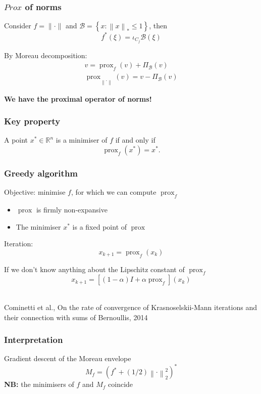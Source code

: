 \documentclass[aspectratio=169]{beamer}
\DeclareMathOperator{\Prox}{prox}
\newcommand{\prox}[2]{\Prox_{#1}\left({#2}\right)}
\newcommand{\RR}{\mathbb{R}}
\newcommand{\norm}[1]{\left\|#1\right\|}
\newcommand{\normtwosq}[1]{\left\|#1\right\|_2^2}
\begin{document}
		\begin{frame}
		\frametitle{$Prox$ of norms}
		Consider $f = \|\cdot\|$ and $\mathcal{B} = \left\{x : \norm{x}_*\le 1 \right\}$, then
		\begin{equation}
		\nonumber f^* \left(\xi\right) = \iota_{C_j}\mathcal{B}\left(\xi\right)
		\end{equation}
		
		By Moreau decomposition:
		\begin{gather}
		\nonumber v = \prox{f}{v} + \Pi_{\mathcal{B}}(v)\\
		\nonumber \prox{\norm{\cdot}}{v} = v - \Pi_{\mathcal{B}}(v)
		\end{gather}
		\pause
		\begin{center}
		\textbf{We have the proximal operator of norms!}
		\end{center}
		\end{frame}
		
		\begin{frame}
		\frametitle{Key property}
		A point $x^*\in \RR^n$ is a minimiser of $f$ if and only if 
		\begin{equation}
		\label{eq:fixedpointprox}
		\prox{f}{x^*} = x^*.
		\end{equation}
		\end{frame}
		
		\begin{frame}
		\frametitle{Greedy algorithm}
		Objective: minimise $f$, for which we can compute $\Prox_f$\\
		\begin{itemize}
		\pause\item $\Prox$ is firmly non-expansive
		\pause\item The minimiser $x^*$ is a fixed point of $\Prox$
		\end{itemize}
		\pause
		Iteration:
		\begin{equation}\nonumber
		x_{k+1} = \prox{f}{x_k}
		\end{equation}
		
		\pause
		If we don't know anything about the Lipschitz constant of $\Prox_f$
		\begin{equation}
		\nonumber x_{k+1} = [(1-\alpha)I + \alpha\Prox_f](x_k)
		\end{equation}
		\quad \\
		\begin{center}
		\textcolor{ExecusharesGrey}{\tiny Cominetti et al., On the rate of convergence of Krasnoselskii-Mann iterations and their connection with	sums of Bernoullis, 2014}
		\end{center}
		\end{frame}
		
		\begin{frame}
		\frametitle{Interpretation}
		Gradient descent of the Moreau envelope
		\begin{equation}
		\nonumber M_{f} = \left(f^* + (1/2)\normtwosq{\cdot}\right)^*
		\end{equation}
		\pause \textbf{NB:} the minimisers of $f$ and $M_f$ coincide
		\end{frame}
		
		
\end{document}
